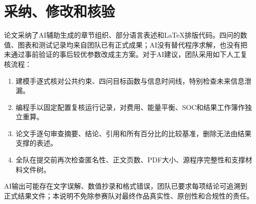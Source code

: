 \documentclass[UTF8,zihao=-4]{ctexart}
\begin{document}
\section{采纳、修改和核验}

论文采纳了AI辅助生成的章节组织、部分语言表述和LaTeX排版代码。四问的数值、图表和测试记录均来自团队已有正式成果；AI没有替代程序求解，也没有把未通过事前验证的事后较优参数改成主方案。对于AI建议，团队采用如下人工复核流程：

\begin{enumerate}
  \item 建模手逐式核对公共约束、四问目标函数与信息时间线，特别检查未来信息泄漏。
  \item 编程手以固定配置复核运行记录，对费用、能量平衡、SOC和结果工作簿作独立重算。
  \item 论文手逐句审查摘要、结论、引用和所有百分比的比较基准，删除无法由结果支撑的表述。
  \item 全队在提交前再次检查匿名性、正文页数、PDF大小、源程序完整性和支撑材料文件树。
\end{enumerate}

AI输出可能存在文字误解、数值抄录和格式错误，团队已要求每项结论可追溯到正式结果文件；本说明不免除参赛队对最终作品真实性、原创性和合规性的责任。
\end{document}
